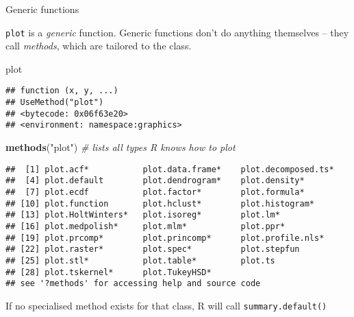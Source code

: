 \documentclass[ignorenonframetext,]{beamer}
\newenvironment{Shaded}{\begin{snugshade}}{\end{snugshade}}
\newcommand{\CommentTok}[1]{\textcolor[rgb]{0.56,0.35,0.01}{\textit{#1}}}
\newcommand{\KeywordTok}[1]{\textcolor[rgb]{0.13,0.29,0.53}{\textbf{#1}}}
\newcommand{\NormalTok}[1]{#1}
\newcommand{\StringTok}[1]{\textcolor[rgb]{0.31,0.60,0.02}{#1}}
\begin{document}
\begin{frame}[fragile]{Generic functions}
\protect\hypertarget{generic-functions-1}{}

\texttt{plot} is a \emph{generic} function. Generic functions don't do
anything themselves -- they call \emph{methods}, which are tailored to
the class.

\footnotesize

\begin{Shaded}
\begin{Highlighting}[]
\NormalTok{plot}
\end{Highlighting}
\end{Shaded}

\begin{verbatim}
## function (x, y, ...) 
## UseMethod("plot")
## <bytecode: 0x06f63e20>
## <environment: namespace:graphics>
\end{verbatim}

\begin{Shaded}
\begin{Highlighting}[]
\KeywordTok{methods}\NormalTok{(}\StringTok{"plot"}\NormalTok{) }\CommentTok{# lists all types R knows how to plot}
\end{Highlighting}
\end{Shaded}

\begin{verbatim}
##  [1] plot.acf*           plot.data.frame*    plot.decomposed.ts*
##  [4] plot.default        plot.dendrogram*    plot.density*      
##  [7] plot.ecdf           plot.factor*        plot.formula*      
## [10] plot.function       plot.hclust*        plot.histogram*    
## [13] plot.HoltWinters*   plot.isoreg*        plot.lm*           
## [16] plot.medpolish*     plot.mlm*           plot.ppr*          
## [19] plot.prcomp*        plot.princomp*      plot.profile.nls*  
## [22] plot.raster*        plot.spec*          plot.stepfun       
## [25] plot.stl*           plot.table*         plot.ts            
## [28] plot.tskernel*      plot.TukeyHSD*     
## see '?methods' for accessing help and source code
\end{verbatim}

If no specialised method exists for that class, R will call
\texttt{summary.default()}

\end{frame}
\end{document}
